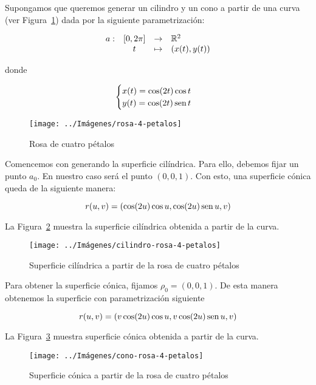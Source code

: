 \documentclass[10pt,a4paper]{article}
\begin{document}
\begin{ejemplo}
Supongamos que queremos generar un cilindro y un cono a partir de una curva (ver Figura~\ref{fig:rosa-4-petalos}) dada por la siguiente parametrización:

$$\begin{array}{rcll}
	a : & [0, 2\pi] & \to & \mathbb{R}^2\\
		& t & \mapsto & (x(t), y(t))
\end{array}$$
		
donde 

$$ \begin{cases}
x(t) = \cos(2t)\cos t \\
y(t) = \cos(2t) \mathop{\mbox{\normalfont sen}}\nolimits t
\end{cases} $$ 
	
\begin{figure}[htbp]
	\centering
	\texttt{[image: ../Imágenes/rosa-4-petalos]}
	\caption{Rosa de cuatro pétalos}
	\label{fig:rosa-4-petalos}
\end{figure}

Comencemos con generando la superficie cilíndrica. Para ello, debemos fijar un punto $a_0$. En nuestro caso será el punto $(0,0,1)$. Con esto, una superficie cónica queda de la siguiente manera:

$$ r(u,v) = (\cos(2u)\cos u, \cos(2u) \mathop{\mbox{\normalfont sen}}\nolimits u, v) $$

La Figura~\ref{fig:cilindro-rosa-4-petalos} muestra la superficie cilíndrica obtenida a partir de la curva. 

\begin{figure}
	\centering
	\texttt{[image: ../Imágenes/cilindro-rosa-4-petalos]}
	\caption{Superficie cilíndrica a partir de la rosa de cuatro pétalos}
	\label{fig:cilindro-rosa-4-petalos}
\end{figure}

Para obtener la superficie cónica, fijamos $\rho_0 = (0,0,1)$. De esta manera obtenemos la superficie con parametrización siguiente

$$ r(u,v) = (v\cos(2u)\cos u, v\cos(2u)\mathop{\mbox{\normalfont sen}}\nolimits u,v) $$ 

La Figura~\ref{fig:cono-rosa-4-petalos} muestra superficie cónica obtenida a partir de la curva.

\begin{figure}[htbp]
	\centering
	\texttt{[image: ../Imágenes/cono-rosa-4-petalos]}
	\caption{Superficie cónica a partir de la rosa de cuatro pétalos}
	\label{fig:cono-rosa-4-petalos}
\end{figure}

\end{ejemplo}
\end{document}
